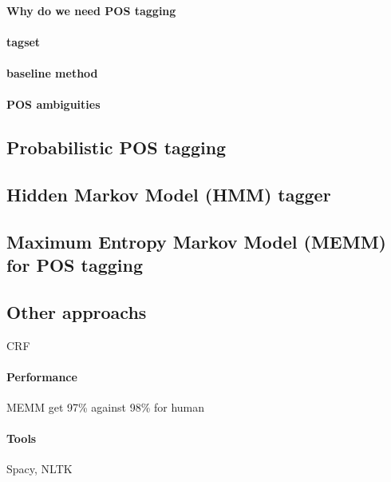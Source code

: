 				\paragraph*{Why do we need POS tagging}

				\paragraph*{tagset}

				\paragraph*{baseline method}


				\paragraph*{POS ambiguities}
			\subsection{Probabilistic POS tagging}

			\subsection{Hidden Markov Model (HMM) tagger}

			\subsection{Maximum Entropy Markov Model (MEMM) for POS tagging}

			\subsection{Other approachs}
				CRF

			\paragraph*{Performance}
				MEMM get 97\% against 98\% for human

			\paragraph*{Tools}
				Spacy, NLTK


		
